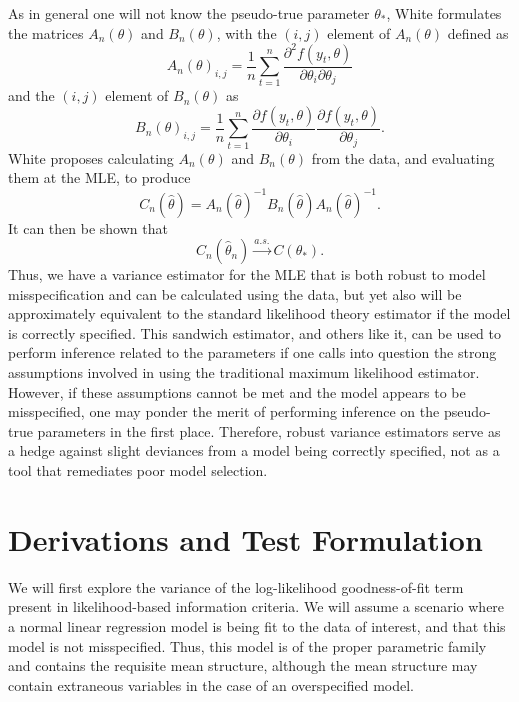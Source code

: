 \documentclass[12pt]{article} %
\theoremstyle{definition}
\begin{document}
		As in general one will not know the pseudo-true parameter $\theta_*$, White formulates the matrices $A_n(\theta)$ and $B_n(\theta)$, with the $(i,j)$ element of $A_n(\theta)$ defined as
		\begin{equation*}
			A_n(\theta)_{i,j} = \frac{1}{n} \sum_{t=1}^{n} \frac{\partial^2 f(y_t,\theta)}{\partial \theta_i \partial \theta_j}
		\end{equation*}
		and the $(i,j)$ element of $B_n(\theta)$ as
		\begin{equation*}
			B_n(\theta)_{i,j} = \frac{1}{n} \sum_{t=1}^{n} \frac{\partial f(y_t,\theta)}{\partial \theta_i} \frac{\partial f(y_t,\theta)}{\partial \theta_j} .
		\end{equation*}
		White proposes calculating $A_n(\theta)$ and $B_n(\theta)$ from the data, and evaluating them at the MLE, to produce
		\begin{equation*}
			C_n(\hat{\theta}) = A_n(\hat{\theta})^{-1} B_n(\hat{\theta}) A_n(\hat{\theta})^{-1} .
		\end{equation*}
		It can then be shown that 
		\begin{equation*}
			C_n(\hat{\theta}_n) \xrightarrow[]{a.s.} C(\theta_* ) .
		\end{equation*}
		Thus, we have a variance estimator for the MLE that is both robust to model misspecification and can be calculated using the data, but yet also will be approximately equivalent to the standard
		likelihood theory estimator if the model is correctly specified. This sandwich estimator, and others like it, can be used to perform inference related to the parameters if one calls into question
		the strong assumptions involved in using the traditional maximum likelihood estimator. However, if these assumptions cannot be met and the model appears to be misspecified, one may ponder
		the merit of performing inference on the pseudo-true parameters in the first place. Therefore, robust variance estimators serve as a hedge against slight deviances from a model
		being correctly specified, not as a tool that remediates poor model selection.

\section{Derivations and Test Formulation}

		We will first explore the variance of the log-likelihood goodness-of-fit term present in likelihood-based information criteria. We will assume a
		scenario where a normal linear regression model is being fit to the data of interest, and that this model is not misspecified. Thus, this model is of the proper
		parametric family and contains the requisite mean structure, although the mean structure may contain extraneous variables in the
		case of an overspecified model.
\end{document}
